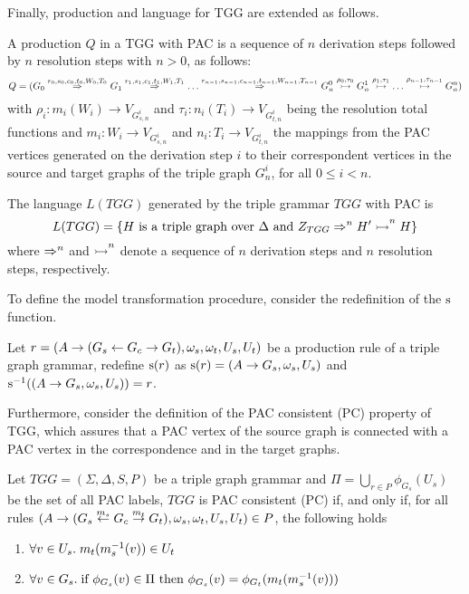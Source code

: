 Finally, production and language for TGG are extended as follows.

\begin{definition}
	A production $Q$ in a TGG with PAC is a sequence of $n$ derivation steps followed by $n$ resolution steps with $n > 0$, as follows:
	\begin{equation*}
	Q = (G_0 \derivpac{r_0}{s_0,c_0,t_0}{W_0,T_0}{} G_1 \derivpac{r_1}{s_1,c_1,t_1}{W_1,T_1}{} \dots \derivpac{r_{n-1}}{s_{n-1},c_{n-1},t_{n-1}}{W_{n-1},T_{n-1}}{} G_n^0 \resolv{\rho_0,\tau_0} G_n^1 \resolv{\rho_1,\tau_1} \dots \resolv{\rho_{n-1},\tau_{n-1}} G_n^n)
	\end{equation*}
	with $\rho_i: m_i(W_i) \to V_{G_{s,n}^i}$ and $\tau_i: n_i(T_i) \to V_{G_{t,n}^i}$ being the resolution total functions and $m_i : W_i \to V_{G_{s,n}^i}$ and $n_i : T_i \to V_{G_{t,n}^i}$ the mappings from the PAC vertices generated on the derivation step $i$ to their correspondent vertices in the source and target graphs of the triple graph $G_n^i$, for all $0 \le i < n$.
\end{definition}

\begin{definition}
	The language $L(TGG)$ generated by the triple grammar $TGG$ with PAC is
	\begin{equation*}
	L(TGG) = \{ H \text{ is a triple graph over } \Delta \text{ and } \startTG{TGG} \tderivpacn{}{n} H' \tresolvn{}{n} H \}
	\end{equation*}
	where $\tderivpacn{}{n}$ and $\tresolvn{}{n}$ denote a sequence of $n$ derivation steps and $n$ resolution steps, respectively.
\end{definition}

To define the model transformation procedure, consider the redefinition of the $\source$ function.

\begin{definition}
	\label{def:sourcepac}
	Let $r = (A \pro (G_s \ms{} G_c \mt{} G_t), \omega_s, \omega_t, U_s, U_t)$ be a production rule of a triple graph grammar, redefine $\source(r)$ as $\source(r) = (A \pro G_s,\omega_s,U_s)$ and $\source^{-1}((A \pro G_s,\omega_s,U_s)) = r$.
\end{definition}

Furthermore, consider the definition of the PAC consistent (PC) property of TGG, which assures that a PAC vertex of the source graph is connected with a PAC vertex in the correspondence and in the target graphs.

\begin{definition}
	Let $TGG = (\Sigma, \Delta, S, P)$ be a triple graph grammar and $\Pi = \bigcup_{r \in P}{\phi_{G_s}(U_s)}$ be the set of all PAC labels, $TGG$ is PAC consistent (PC) if, and only if, for all rules $(A \pro (G_s \ms{m_s} G_c \mt{m_t} G_t), \omega_s, \omega_t, U_s, U_t) \in P$, the following holds
	\begin{enumerate}
		\item $\forall v \in U_s \. m_t(m_s^{-1}(v)) \in U_t$
		\item $\forall v \in G_s \. \text{if } \phi_{G_s}(v) \in \Pi \text{ then } \phi_{G_s}(v) = \phi_{G_t}(m_t(m_s^{-1}(v)))$
	\end{enumerate}
\end{definition}


